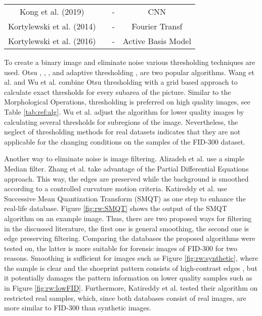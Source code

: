 \documentclass[draft,final]{vutinfth} %
\begin{document}
\begin{sidewaystable}
\begin{minipage}{\linewidth}
\begin{tabular}{c|c|c|c}
Kong et al. (2019) \cite{kong2019cross} & & - & CNN \\
Kortylewski et al. (2014) \cite{kortylewski2014unsupervised} & & - & Fourier Transf \\
Kortylewski et al. (2016) \cite{kortylewski2016probabilistic} & & - & Active Basis Model \\
\end{tabular}
\label{tab:ref:alg} 
\end{minipage}
\end{sidewaystable}

\par
To create a binary image and eliminate noise various thresholding techniques are used.
Otsu  \cite{wu2019crime}, \cite{algarni2008novel}, \cite{alizadeh2017automatic}, \cite{kong2014novel} and adaptive thresholding \cite{wang2014automatic}, \cite{li2014retrieval} are two popular algorithms.
Wang et al. \cite{wang2014automatic} and Wu et al. \cite{wu2019crime} combine Otsu thresholding with a grid based approach to calculate exact thresholds for every subarea of the picture.
Similar to the Morphological Operations, thresholding is preferred on high quality images, see Table \ref{tab:ref:alg}.
Wu et al. \cite{wu2019crime} adjust the algorithm for lower quality images by calculating several thresholds for subregions of the image.
Nevertheless, the neglect of thresholding methods for real datasets indicates that they are not applicable for the changing conditions on the samples of the FID-300 dataset.
     
\par
Another way to eliminate noise is image filtering.
Alizadeh et al. \cite{alizadeh2017automatic} use a simple Median filter.
Zhang et al. \cite{zhang2005automatic} take advantage of the Partial Differential Equations approach.
This way, the edges are preserved while the background is smoothed according to a controlled curvature motion criteria. 
Katireddy et al. \cite{katireddy2017novel} use Successive Mean Quantization Transform (SMQT) \cite{nilsson2013smqt} as one step to enhance the real-life database.
Figure \ref{fig:rw:SMQT} shows the output of the SMQT algorithm on an example image.
Thus, there are two proposed ways for filtering in the discussed literature, the first one is general smoothing, the second one is edge preserving filtering.
Comparing the databases the proposed algorithms were tested on, the latter is more suitable for forensic images of FID-300 for two reasons. 
Smoothing is sufficient for images such as Figure \ref{fig:rw:synthetic}, where the sample is clear and the shoeprint pattern consists of high-contrast edges \cite{alizadeh2017automatic}, but it potentially damages the pattern information on lower quality samples such as in Figure \ref{fig:rw:lowFID}.
Furthermore, Katireddy et al. \cite{katireddy2017novel} tested their algorithm on restricted real samples, which, since both databases consist of real images, are more similar to FID-300 than synthetic images. 
\end{document}
